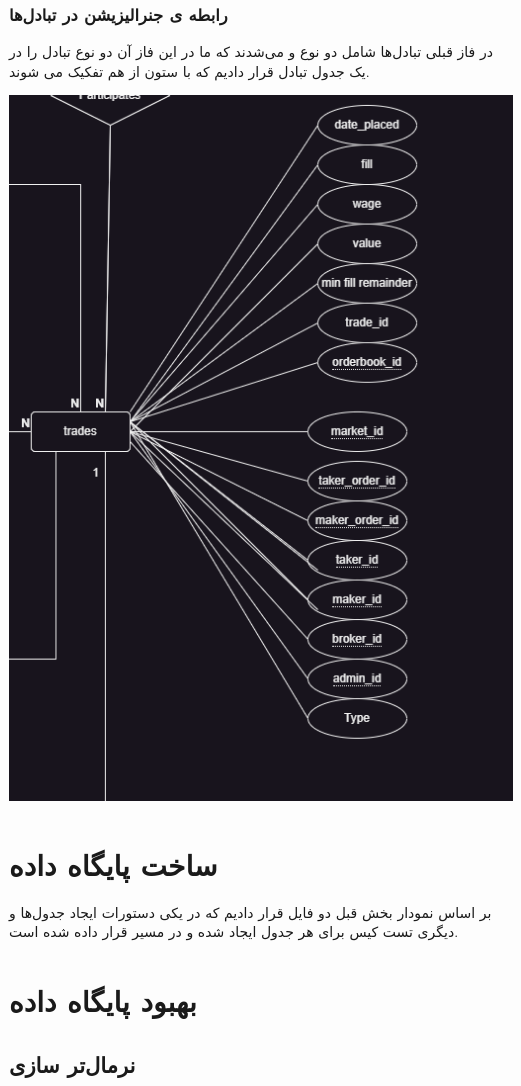 \documentclass{book}
\begin{document}
\subsection{رابطه ‌ی جنرالیزیشن در تبادل‌ها}
در فاز قبلی تبادل‌ها شامل دو نوع  و  می‌شدند که ما در این فاز آن دو نوع تبادل را در یک جدول تبادل قرار دادیم که با ستون  از هم تفکیک می شوند.

\includegraphics[width=0.8\linewidth]{trades.png}
\newpage

\chapter{ساخت پایگاه داده}
بر اساس نمودار بخش قبل دو فایل  قرار دادیم که در یکی دستورات ایجاد جدول‌ها و دیگری تست کیس برای هر جدول ایجاد شده و در مسیر  قرار داده شده است.

\chapter{بهبود پایگاه داده}
\section{نرمال‌تر سازی}
\end{document}
